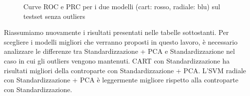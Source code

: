 \begin{figure}[H]
    \centering

    
    \quad
    

     \label{fig:roc_prc_svm}
    \caption{Curve ROC e PRC per i due modelli (cart: rosso, radiale: blu) sul testset senza outliers}
\end{figure}

\newpage

\noindent
Riassumiamo nuovamente i risultati presentati nelle tabelle sottostanti. Per scegliere i modelli migliori che verranno proposti in questo lavoro, è necessario analizzare le differenze tra Standardizzazione + PCA e Standardizzazione nel caso in cui gli outliers vengono mantenuti.
CART con Standardizzazione ha risultati migliori della controparte con Standardizzazione + PCA.
L'SVM radiale con Standardizzazione + PCA è leggermente migliore rispetto alla controparte con Standardizzazione.

